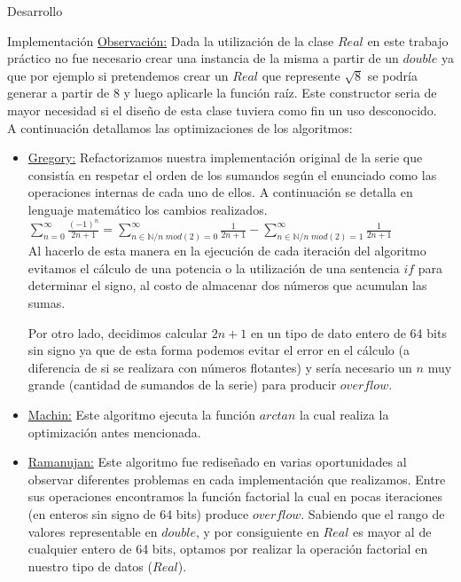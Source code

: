 \begin{section}{Desarrollo}
\begin{subsection}{Implementación}
		\underline{Observación:} Dada la utilización de la clase $Real$ en este trabajo práctico no fue necesario crear una instancia de la misma a partir de un $double$ ya que por ejemplo si pretendemos crear un $Real$ que represente $\sqrt{8}$ se podría generar a partir de $8$ y luego aplicarle la función raíz. Este constructor seria de mayor necesidad si el diseño de esta clase tuviera como fin un uso desconocido.\\
		   
	   A continuación detallamos las optimizaciones de los algoritmos:

		\begin{itemize}
			\item \underline{Gregory:} Refactorizamos nuestra implementación original de la serie que consistía en respetar el orden de los sumandos según el enunciado como las operaciones internas de cada uno de ellos. A continuación se detalla en lenguaje matemático los cambios realizados.\\
							
				$\sum_{n=0}^{\infty}\frac{(-1)^n}{2n+1} = \sum_{n \in \mathbb{N} / n\;mod(2)=0}^{\infty}\frac{1}{2n+1}-\sum_{n \in \mathbb{N} / n\;mod(2)=1}^{\infty}\frac{1}{2n+1}$\\
				
				Al hacerlo de esta manera en la ejecución de cada iteración del algoritmo evitamos el cálculo de una potencia o la utilización de una sentencia $if$ para determinar el signo, al costo de almacenar dos números que acumulan las sumas.
				
				Por otro lado, decidimos calcular $2n+1$ en un tipo de dato entero de 64 bits sin signo ya que de esta forma podemos evitar el error en el cálculo (a diferencia de si se realizara con números flotantes) y sería necesario un $n$ muy grande (cantidad de sumandos de la serie) para producir $overflow$.
				
			\item \underline{Machin:} Este algoritmo ejecuta la función $arctan$ la cual realiza la optimización antes mencionada.
			
			\item \underline{Ramanujan:} Este algoritmo fue rediseñado en varias oportunidades al observar diferentes problemas en cada implementación que realizamos. Entre sus operaciones encontramos la función factorial la cual en pocas iteraciones (en enteros sin signo de 64 bits) produce $overflow$. Sabiendo que el rango de valores representable en $double$, y por consiguiente en $Real$ es mayor al de cualquier entero de 64 bits, optamos por realizar la operación factorial en nuestro tipo de datos ($Real$).
			

\end{itemize}
\end{subsection}
\end{section}
